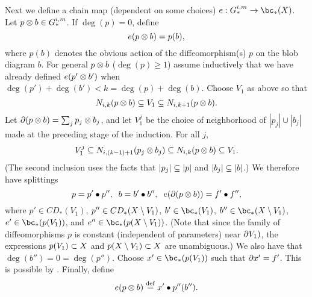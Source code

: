 Next we define a chain map (dependent on some choices) $e: G_*^{i,m} \to \bc_*(X)$.
Let $p\otimes b \in G_*^{i,m}$.
If $\deg(p) = 0$, define
\[
	e(p\otimes b) = p(b) ,
\]
where $p(b)$ denotes the obvious action of the diffeomorphism(s) $p$ on the blob diagram $b$.
For general $p\otimes b$ ($\deg(p) \ge 1$) assume inductively that we have already defined
$e(p'\otimes b')$ when $\deg(p') + \deg(b') < k = \deg(p) + \deg(b)$.
Choose $V_1$ as above so that 
\[
	N_{i,k}(p\otimes b) \subseteq V_1 \subseteq N_{i,k+1}(p\otimes b) .
\]
Let $\partial(p\otimes b) = \sum_j p_j\otimes b_j$, and let $V_1^j$ be the choice of neighborhood
of $|p_j|\cup |b_j|$ made at the preceding stage of the induction.
For all $j$, 
\[
	V_1^j \subseteq N_{i,(k-1)+1}(p_j\otimes b_j) \subseteq N_{i,k}(p\otimes b) \subseteq V_1 .
\]
(The second inclusion uses the facts that $|p_j| \subseteq |p|$ and $|b_j| \subseteq |b|$.)
We therefore have splittings
\[
	p = p'\bullet p'' , \;\; b = b'\bullet b'' , \;\; e(\partial(p\otimes b)) = f'\bullet f'' ,
\]
where $p' \in CD_*(V_1)$, $p'' \in CD_*(X\setminus V_1)$, 
$b' \in \bc_*(V_1)$, $b'' \in \bc_*(X\setmin V_1)$, 
$e' \in \bc_*(p(V_1))$, and $e'' \in \bc_*(p(X\setmin V_1))$.
(Note that since the family of diffeomorphisms $p$ is constant (independent of parameters)
near $\partial V_1)$, the expressions $p(V_1) \subset X$ and $p(X\setminus V_1) \subset X$ are
unambiguous.)
We also have that $\deg(b'') = 0 = \deg(p'')$.
Choose $x' \in \bc_*(p(V_1))$ such that $\partial x' = f'$.
This is possible by .
Finally, define
\[
	e(p\otimes b) \stackrel{\mathrm{def}}{=} x' \bullet p''(b'') .
\]


\medskip








